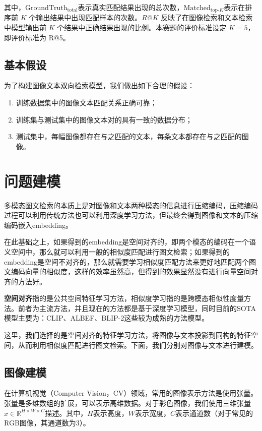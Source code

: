 \documentclass[a4paper]{zreport}
\begin{document}
其中，$\mathrm{GroundTruth}_{\text{total}}$表示真实匹配结果出现的总次数，$\mathrm{Matched}_{\text{top-}K}$表示在排序前 $K$ 个输出结果中出现匹配样本的次数。$R@K$ 反映了在图像检索和文本检索中模型输出前 $K$ 个结果中正确结果出现的比例。本赛题的评价标准设定 $K=5$，即评价标准为 R@5。

\subsection{基本假设}

为了构建图像文本双向检索模型，我们做出如下合理的假设：

\begin{enumerate}
\item 训练数据集中的图像文本匹配关系正确可靠；
\item 训练集与测试集中的图像文本对的具有一致的数据分布；
\item 测试集中，每幅图像都存在与之匹配的文本，每条文本都存在与之匹配的图像。
\end{enumerate}

\newpage

\section{问题建模} \label{modeling}

多模态图文检索的本质上是对图像和文本两种模态的信息进行压缩编码，压缩编码过程可以利用传统方法也可以利用深度学习方法，但最终会得到图像和文本的压缩编码嵌入embedding。

在此基础之上，如果得到的embedding是空间对齐的，即两个模态的编码在一个语义空间中，那么就可以利用一般的相似度匹配进行图文检索；如果得到的embedding是空间不对齐的，那么就需要学习相似度匹配方法来更好地匹配两个图文编码向量的相似度，这样的效率虽然高，但得到的效果显然没有进行向量空间对齐的方法好。

\textbf{空间对齐}指的是公共空间特征学习方法，相似度学习指的是跨模态相似性度量方法。前者为主流方法，并且现在的方法都是基于深度学习模型，同时目前的SOTA模型主要为：CLIP、ALBEF、BLIP-2这些较为成熟的方法模型。

这里，我们选择的是空间对齐的特征学习方法，将图像与文本投影到同构的特征空间，从而利用相似度匹配进行图文检索。下面，我们分别对图像与文本进行建模。

\subsection{图像建模}

在计算机视觉（Computer Vision，CV）领域，常用的图像表示方法是使用张量。张量是多维数组的扩展，可以表示高维数据。对于彩色图像，我们使用三维张量$x \in \mathbb{R}^{H \times W \times C}$描述。其中，$H$表示高度，$W$表示宽度，$C$表示通道数（对于常见的RGB图像，其通道数为3）。
\end{document}
